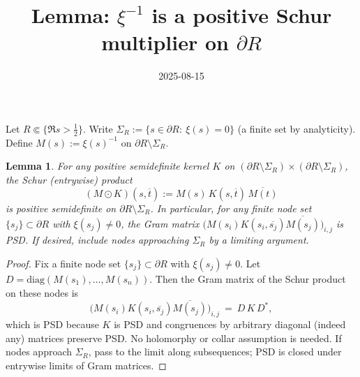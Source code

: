 \documentclass[11pt]{article}
\title{Lemma: $\xi^{-1}$ is a positive Schur multiplier on $\partial R$}
\date{2025-08-15}
\newtheorem{lemma}{Lemma}
\begin{document}
\maketitle

Let $R\Subset\{\Re s>\tfrac12\}$. Write $\Sigma_R:=\{s\in\partial R:\ \xi(s)=0\}$ (a finite set by analyticity). Define $M(s):=\xi(s)^{-1}$ on $\partial R\setminus\Sigma_R$.

\begin{lemma}
For any positive semidefinite kernel $K$ on $(\partial R\setminus\Sigma_R)\times(\partial R\setminus\Sigma_R)$, the Schur (entrywise) product
\[ (M\odot K)(s,\overline t):= M(s)\,K(s,\overline t)\,\overline{M(t)}\]
is positive semidefinite on $\partial R\setminus\Sigma_R$. In particular, for any finite node set $\{s_j\}\subset\partial R$ with $\xi(s_j)\ne0$, the Gram matrix $\big(M(s_i)K(s_i,\overline{s_j})\overline{M(s_j)}\big)_{i,j}$ is PSD. If desired, include nodes approaching $\Sigma_R$ by a limiting argument.
\end{lemma}

\begin{proof}
Fix a finite node set $\{s_j\}\subset\partial R$ with $\xi(s_j)\ne0$. Let $D=\mathrm{diag}(M(s_1),\dots,M(s_n))$. Then the Gram matrix of the Schur product on these nodes is
\[
\big(M(s_i)K(s_i,\overline{s_j})\overline{M(s_j)}\big)_{i,j}\ =\ D\,K\,D^*,
\]
which is PSD because $K$ is PSD and congruences by arbitrary diagonal (indeed any) matrices preserve PSD. No holomorphy or collar assumption is needed. If nodes approach $\Sigma_R$, pass to the limit along subsequences; PSD is closed under entrywise limits of Gram matrices.
\end{proof}
\end{document}
